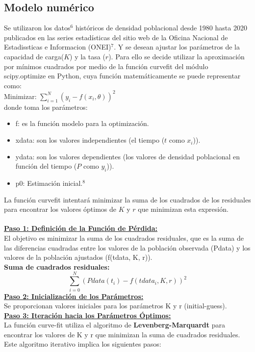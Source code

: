 \documentclass[a4paper,10pt,twocolumn]{article}
\begin{document}
	\subsection{Modelo numérico}\label{sub:num}
Se utilizaron los datos$^{6}$ históricos de densidad poblacional desde 1980 hasta 2020 publicados en las series estadísticas del sitio web de la Oficina Nacional de Estadissticas e Informacion (ONEI)$^{7}$. Y se desean ajustar los parámetros de la capacidad de carga($K$) y la tasa ($r$).
Para ello se decide utilizar la aproximación por mínimos cuadrados por medio de la función curvefit del módulo scipy.optimize en Python, cuya función matemáticamente se puede representar como:\\
Minimizar: $\sum_{i=1}^{N} (y_{i} - f(x_{i}, \theta))^2 $ \\
donde toma los parámetros:
\begin{itemize}
	\item f: es la función modelo para la optimización.
	\item xdata: son los valores independientes (el tiempo ($t$ como $x_{i}$)).
	\item ydata: son los valores dependientes (los valores de densidad poblacional en función del tiempo ($P$ como $y_{i}$)).
	\item p0: Estimación inicial.$^{8}$
\end{itemize}
\small{La función curvefit intentará minimizar la suma de los cuadrados de los residuales para encontrar los valores óptimos de $K$ y $r$ que minimizan esta expresión.} \\\\
\underline{\textbf{Paso 1: Definición de la Función de Pérdida:}}\\
\small{El objetivo es minimizar la suma de los cuadrados residuales, que es la suma de las diferencias cuadradas entre los valores de la población observada (Pdata) y los valores de la población ajustados (f(tdata, K, r)).\\}
\textbf{Suma de cuadrados residuales:}
	$$\sum_{i=0}^{N}(Pdata(t_{i}) - f(tdata_{i}, K, r))^{2}$$
\underline{\textbf{Paso 2: Inicialización de los Parámetros:}}\\
\small{Se proporcionan valores iniciales para los parámetros K y r (initial-guess).\\}
\underline{\textbf{Paso 3: Iteración hacia los Parámetros Óptimos:}}\\
\small{La función curve-fit utiliza el algoritmo de \textbf{Levenberg-Marquardt} para encontrar los valores de K y r que minimizan la suma de cuadrados residuales. Este algoritmo iterativo implica los siguientes pasos:}
\end{document}
